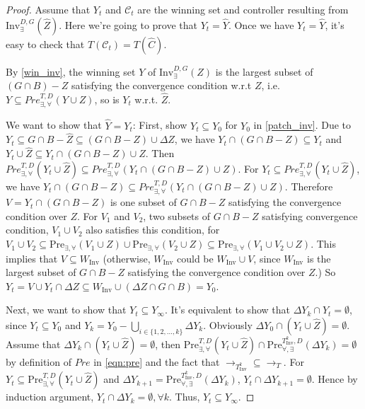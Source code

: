 \begin{proof}
	Assume that $ Y_t $ and $ \mathcal{C}_t $ are the winning set and controller resulting from $ \text{Inv}_{\exists}^{D,G} (\widehat{Z}) $. Here we're going to prove that $ Y_t=\widehat{Y}$. Once we have $ Y_t=\widehat{Y}$, it's easy to check that $ T(\mathcal{C}_t) = T(\widehat{C}) $.
	
	By \eqref{win_inv}, the winning set $ Y $ of $ \text{Inv}_{\exists}^{D,G} (Z) $ is the largest subset of $ (G\cap B) - Z  $ satisfying the convergence condition w.r.t $ Z $, i.e. $ Y \subseteq Pre^{T,D}_{\exists, \forall}(Y\cup Z) $, so is $ Y_t $ w.r.t. $ \widehat{Z} $.
	
	We want to show that $ \widehat{Y} = Y_t$: First, show $ Y_t \subseteq Y_0 $ for $ Y_0 $ in \eqref{patch_inv}. Due to $ Y_t \subseteq G\cap B-\widehat{Z} \subseteq (G\cap B -Z)\cup \Delta Z $, we have $ Y_t\cap (G\cap B-Z)\subseteq Y_t $ and $ Y_t\cup \widehat{Z} \subseteq Y_t\cap (G\cap B-Z)\cup Z$. Then $ Pre^{T,D}_{\exists,\forall}(Y_t\cup \widehat{Z}) \subseteq Pre^{T,D}_{\exists,\forall}(Y_t\cap (G\cap B-Z)\cup Z)$. For $ Y_t \subseteq Pre^{T,D}_{\exists,\forall}(Y_t\cup \widehat{Z})$, we have $ Y_t\cap (G\cap B-Z)\subseteq Pre^{T,D}_{\exists,\forall}(Y_t\cap (G\cap B-Z)\cup Z) $. Therefore $ V= Y_t \cap (G\cap B -Z) $ is one subset of $ G\cap B -Z $ satisfying the convergence condition over $ Z $. For $ V_1 $ and $ V_2 $, two subsets of $ G\cap B-Z $ satisfying convergence condition, $ V_1\cup V_2 $ also satisfies this condition, for $ V_1\cup V_2\subseteq \text{Pre}_{\exists,\forall}(V_1\cup Z)\cup \text{Pre}_{\exists,\forall}(V_2\cup Z)\subseteq \text{Pre}_{\exists,\forall}(V_1\cup V_2\cup Z) $. This implies that $ V \subseteq W_{\text{Inv}} $ (otherwise, $ W_{\text{Inv}} $ could be $ W_{\text{Inv}}\cup V $, since $ W_{\text{Inv}} $ is the largest subset of $ G\cap B-Z $ satisfying the convergence condition over $ Z $.) So $ Y_t = V\cup Y_t\cap \Delta Z \subseteq W_{\text{Inv}}\cup (\Delta Z \cap G\cap B) = Y_0$. 
	
	Next, we want to show that $ Y_t \subseteq Y_{\infty} $. It's equivalent to show that $ \Delta Y_k\cap Y_t = \emptyset $, since $ Y_t\subseteq Y_0 $ and $ Y_k = Y_0 - \bigcup_{i\in \{1,2,...,k\}} \Delta Y_k$. Obviously $ \Delta Y_0\cap (Y_t\cup \widehat{Z}) = \emptyset $. Assume that $ \Delta Y_k \cap (Y_t\cup \widehat{Z}) = \emptyset $, then $ \text{Pre}_{\exists,\forall}^{T,D} (Y_t\cup \widehat{Z}) \cap \text{Pre}_{\forall, \exists}^{T_{\text{Inv}}^k,D}(\Delta Y_k) = \emptyset$ by definition of $ Pre $ in \eqref{eqn:pre} and the fact that $ \rightarrow_{T_{\text{Inv}}^k}\subseteq \rightarrow_{T} $. For $ Y_t \subseteq \text{Pre}_{\exists,\forall}^{T,D} (Y_t\cup \widehat{Z}) $ and $ \Delta Y_{k+1} = \text{Pre}_{\forall, \exists}^{T_{\text{Inv}}^k,D}(\Delta Y_k) $, $ Y_t\cap \Delta Y_{k+1} = \emptyset $. Hence by induction argument, $ Y_t \cap \Delta Y_k = \emptyset, \forall k $. Thus, $ Y_t\subseteq Y_{\infty} $. 
	

\end{proof}
